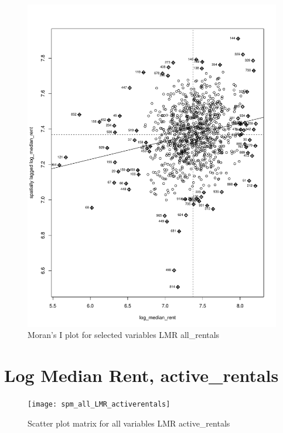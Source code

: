 \documentclass[10pt, letterpaper]{amsart}
\begin{document}
\begin{figure}[H]
  \caption{Moran's I plot for selected variables LMR all\_rentals}
  \includegraphics[scale=0.6]{Moran_LMR_allrentals}
\end{figure}

\newpage
\section{Log Median Rent, active\_rentals}

\begin{figure}[H]
  \caption{Scatter plot matrix for all variables LMR active\_rentals}
  \texttt{[image: spm\_all\_LMR\_activerentals]}
\end{figure}
\end{document}
